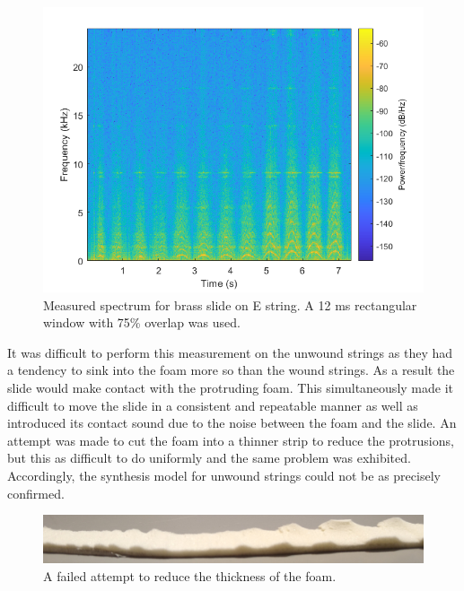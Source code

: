 \documentclass[../main.tex]{subfiles}
\begin{document}
\begin{figure}[h]
    \centering
    \includegraphics[scale=.65]{./images/plots/ContactNoiseEBrass.png}
    \caption{Measured spectrum for brass slide on E string. A 12 ms rectangular window with 75\% overlap was used.}
    \label{fig:ContactNoiseEBrass}
\end{figure}

It was difficult to perform this measurement on the unwound strings as they had a tendency to sink into the foam more so than the wound strings. As a result the slide would make contact with the protruding foam. This simultaneously made it difficult to move the slide in a consistent and repeatable manner as well as introduced its contact sound due to the noise between the foam and the slide. An attempt was made to cut the foam into a thinner strip to reduce the protrusions, but this as difficult to do uniformly and the same problem was exhibited. Accordingly, the synthesis model for unwound strings could not be as precisely confirmed.

\begin{figure}[h]
    \centering
    \includegraphics[scale=.15]{./images/pictures/CutFoam.png}
    \caption{A failed attempt to reduce the thickness of the foam.}
    \label{fig:CutFoam}
\end{figure}
\end{document}
